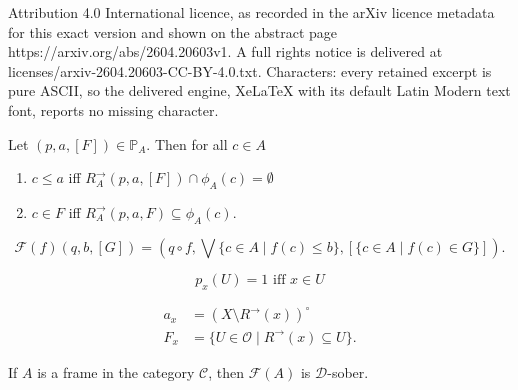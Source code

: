 \documentclass[10pt,a4paper]{amsart}
\newcommand{\Ccal}{\mathcal{C}} %
\newcommand{\Dcal}{\mathcal{D}} %
\newcommand{\Ocal}{\mathcal{O}} %
\newcommand{\Pbb}{\mathbb{P}}
\newcommand{\dirim}{^{\rightarrow\!}}
\newcommand{\interiorop}[1]{{#1}^\circ}
\begin{document}
Attribution 4.0 International licence, as recorded in the arXiv licence metadata for this exact version and shown on the abstract page https://arxiv.org/abs/2604.20603v1. A full rights notice is delivered at licenses/arxiv-2604.20603-CC-BY-4.0.txt. Characters: every retained excerpt is pure ASCII, so the delivered engine, XeLaTeX with its default Latin Modern text font, reports no missing character.
\begin{lemma}
\label{tripmot}
Let $(p,a,[F]) \in \Pbb _A$. Then for all $c \in A$ 
\begin{enumerate}
\item $c \leq a$ iff $R_A \dirim (p,a,[F])\cap\phi _A (c) 
= \emptyset $ 
\item $c \in  F$ iff 
$R_A \dirim (p,a,F)
\subseteq \phi _A (c)$.
\end{enumerate}
\end{lemma}

\begin{equation}
\label{pointFunctorOnMorphs}
 \mathcal{F} (f)(q,b,[G]) = 
( q \circ f ,                           \bigvee \{ c \in A \mid f(c) \leq b \} ,  
[\{ c \in A \mid f(c) \in G \} ]). 
\end{equation}

\begin{equation}
\label{psiXp}
p_x (U) = 1  \mbox{ iff }  x \in U 
\end{equation}

\begin{align} 
\label{psiXa}
a_x  & =  
\interiorop{(
X \setminus R\dirim(x))
}    \\
\label{psiXF}
F_x  & =  \{ U \in \Ocal \mid R\dirim (x) \subseteq U \} . 
\end{align}

\begin{lemma}
\label{result:sober}
If $A$ is a frame in the category $\Ccal$, then $\mathcal{F} (A)$ is $\Dcal$-sober.
\end{lemma}
\end{document}
